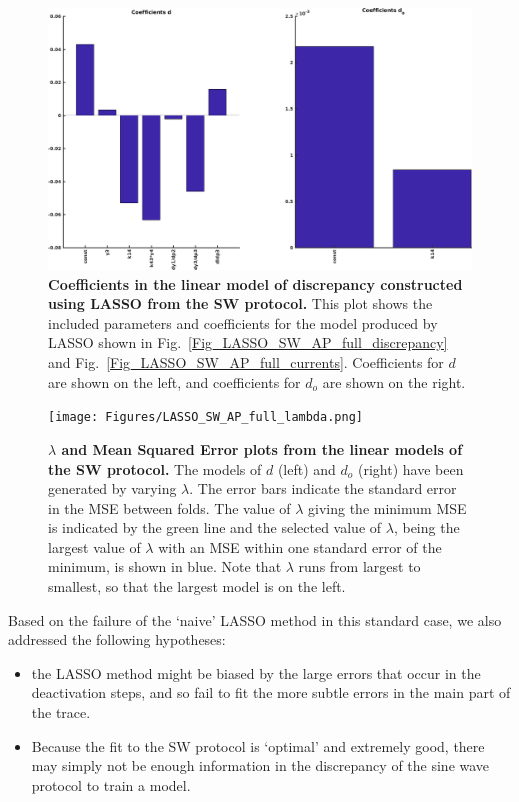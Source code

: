 \documentclass[11pt,a4paper,oneside]{article}
\begin{document}
{\begin{figure}[t]
\begin{center}
\includegraphics[scale=0.42]{Figures/LASSO_SW_AP_full_coefficients.png}
\caption{\textbf{Coefficients in the linear model of discrepancy constructed using LASSO from the SW protocol.} This plot shows the included parameters and coefficients for the model produced by LASSO shown in Fig.~\ref{Fig_LASSO_SW_AP_full_discrepancy} and Fig.~\ref{Fig_LASSO_SW_AP_full_currents}. Coefficients for $d$ are shown on the left, and coefficients for $d_o$ are shown on the right.} 
\label{Fig_LASSO_SW_AP_coefficients}
\end{center}
\end{figure}

\begin{figure}[hbt]
\begin{center}
\texttt{[image: Figures/LASSO\_SW\_AP\_full\_lambda.png]}
\caption{\textbf{$\lambda$ and Mean Squared Error plots from the linear models of the SW protocol.} The models of $d$ (left) and $d_o$ (right) have been generated by varying $\lambda$. The error bars indicate the standard error in the MSE between folds. The value of $\lambda$ giving the minimum MSE is indicated by the green line and the selected value of $\lambda$, being the largest value of $\lambda$ with an MSE within one standard error of the minimum, is shown in blue. Note that $\lambda$ runs from largest to smallest, so that the largest model is on the left.}
\label{Fig_LASSO_SW_AP_lambda}
\end{center}
\end{figure}

\clearpage

Based on the failure of the `naive' LASSO method in this standard case, we also addressed the following hypotheses:
\begin{itemize}
\item the LASSO method might be biased by the large errors that occur in the deactivation steps, and so fail to fit the more subtle errors in the main part of the trace.
\item Because the fit to the SW protocol is `optimal' and  extremely good, there may simply not be enough information in the discrepancy of the sine wave protocol to train a model.
\end{itemize}

}
\end{document}
